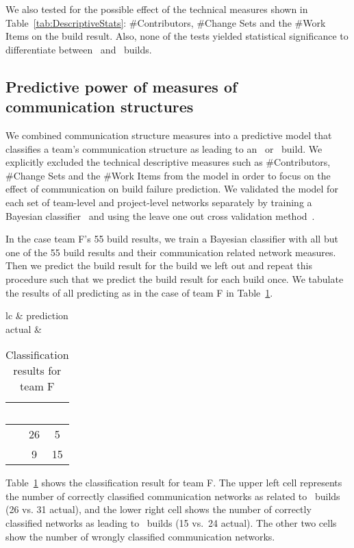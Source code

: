 We also tested for the possible effect of the technical measures shown in
Table~\ref{tab:DescriptiveStats}: \#Contributors, \#Change Sets and the \#Work
Items on the build result. Also, none of the tests yielded statistical
significance to differentiate between \error\ and \ok\ builds.


\subsection{Predictive power of measures of communication structures}

We combined communication structure measures into a predictive model
that classifies a team's communication structure as leading to an \error\ or \ok\
build. We explicitly excluded the technical descriptive measures such as
\#Contributors, \#Change Sets and the \#Work Items from the model in order to
focus on the effect of communication on build failure prediction. We validated the
model for each set of team-level and project-level networks separately by
training a Bayesian classifier~\cite{Hastie:2003ys} and using the leave one
out cross validation method~\cite{Hastie:2003ys}.

In the case team F's 55 build results, we train a Bayesian classifier with all but one of the 55 build results and their communication related network measures. 
Then we predict the build result for the build we left out and repeat this procedure such that we predict the build result for each build once.
We tabulate the results of all predicting as in the case of team F in Table~\ref{tab:cont}.

\begin{table}[t] \centering\small
\caption{Classification results for team F}
\begin{tabular}{lc}
& prediction \\
actual & 
\begin{tabular}{r|c|c|}
& \ok\ & \error\ \\\hline
\ok\ & 26 & 5 \\\hline
\error\ & 9 & 15 \\\hline
\end{tabular}
\end{tabular}
\label{tab:cont}
\vspace{20pt}
\end{table}

Table~\ref{tab:cont} shows the classification result for team F. The upper left
cell represents the number of correctly classified communication networks as
related to \ok\ builds (26 vs. 31 actual), and the lower right cell shows the
number of correctly classified networks as leading to \error\ builds (15 vs.~24 actual). The other two cells show the number of wrongly classified communication
networks.

